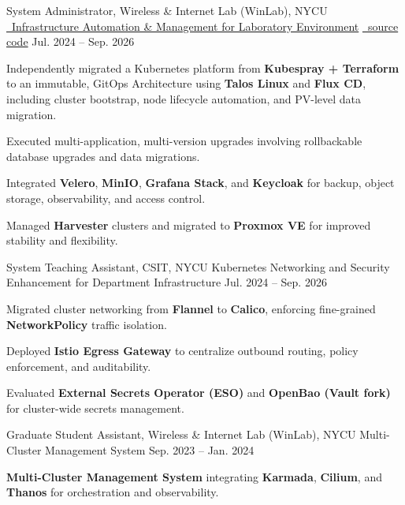 \begin{cventries}
  \cventry
    {System Administrator, Wireless \& Internet Lab (WinLab), NYCU} %
    {\href{https://github.com/ChesterChuTw/winfra-cluster-management}
    {\faGithub\ Infrastructure Automation \& Management for Laboratory Environment}}
    {\href{https://github.com/ChesterChuTw/winfra-cluster-management}{\faGithub\ source code}} %
    {Jul. 2024 -- Sep. 2026} %
    {
      \begin{cvitems}
        \item {Independently migrated a Kubernetes platform from \textbf{Kubespray + Terraform} to an immutable, GitOps Architecture using \textbf{Talos Linux} and \textbf{Flux CD}, including cluster bootstrap, node lifecycle automation, and PV-level data migration.}
        \item {Executed multi-application, multi-version upgrades involving rollbackable database upgrades and data migrations.}
        \item {Integrated \textbf{Velero}, \textbf{MinIO}, \textbf{Grafana Stack}, and \textbf{Keycloak} for backup, object storage, observability, and access control.}
        \item {Managed \textbf{Harvester} clusters and migrated to \textbf{Proxmox VE} for improved stability and flexibility.}
      \end{cvitems}
    }

  \cventry
    {System Teaching Assistant, CSIT, NYCU} %
    {Kubernetes Networking and Security Enhancement for Department Infrastructure} %
    {} %
    {Jul. 2024 -- Sep. 2026} %
    {
      \begin{cvitems}
        \item {Migrated cluster networking from \textbf{Flannel} to \textbf{Calico}, enforcing fine-grained \textbf{NetworkPolicy} traffic isolation.}
        \item {Deployed \textbf{Istio Egress Gateway} to centralize outbound routing, policy enforcement, and auditability.}
        \item {Evaluated \textbf{External Secrets Operator (ESO)} and \textbf{OpenBao (Vault fork)} for cluster-wide secrets management.}
      \end{cvitems}
    }

  \cventry
    {Graduate Student Assistant, Wireless \& Internet Lab (WinLab), NYCU} %
    {Multi-Cluster Management System} %
    {} %
    {Sep. 2023 -- Jan. 2024} %
    {
      \begin{cvitems}
        \item {\textbf{Multi-Cluster Management System} integrating \textbf{Karmada}, \textbf{Cilium}, and \textbf{Thanos} for orchestration and observability.}
      \end{cvitems}
    }


\end{cventries}
